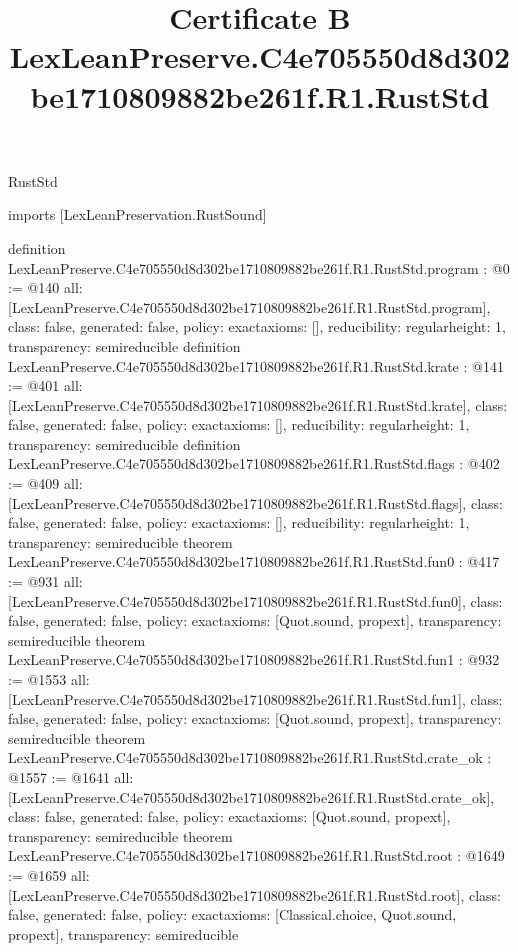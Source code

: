 \begin{lexlean}{RustStd}
\title{Certificate B LexLeanPreserve.C4e705550d8d302be1710809882be261f.R1.RustStd}
\begin{coremodule}
imports [LexLeanPreservation.RustSound]

definition LexLeanPreserve.C4e705550d8d302be1710809882be261f.R1.RustStd.program : @0 := @140 {
  all: [LexLeanPreserve.C4e705550d8d302be1710809882be261f.R1.RustStd.program],
  class: false,
  generated: false,
  policy: exact{axioms: []},
  reducibility: regular{height: 1},
  transparency: semireducible
}
definition LexLeanPreserve.C4e705550d8d302be1710809882be261f.R1.RustStd.krate : @141 := @401 {
  all: [LexLeanPreserve.C4e705550d8d302be1710809882be261f.R1.RustStd.krate],
  class: false,
  generated: false,
  policy: exact{axioms: []},
  reducibility: regular{height: 1},
  transparency: semireducible
}
definition LexLeanPreserve.C4e705550d8d302be1710809882be261f.R1.RustStd.flags : @402 := @409 {
  all: [LexLeanPreserve.C4e705550d8d302be1710809882be261f.R1.RustStd.flags],
  class: false,
  generated: false,
  policy: exact{axioms: []},
  reducibility: regular{height: 1},
  transparency: semireducible
}
theorem LexLeanPreserve.C4e705550d8d302be1710809882be261f.R1.RustStd.fun0 : @417 := @931 {
  all: [LexLeanPreserve.C4e705550d8d302be1710809882be261f.R1.RustStd.fun0],
  class: false,
  generated: false,
  policy: exact{axioms: [Quot.sound, propext]},
  transparency: semireducible
}
theorem LexLeanPreserve.C4e705550d8d302be1710809882be261f.R1.RustStd.fun1 : @932 := @1553 {
  all: [LexLeanPreserve.C4e705550d8d302be1710809882be261f.R1.RustStd.fun1],
  class: false,
  generated: false,
  policy: exact{axioms: [Quot.sound, propext]},
  transparency: semireducible
}
theorem LexLeanPreserve.C4e705550d8d302be1710809882be261f.R1.RustStd.crate_ok : @1557 := @1641 {
  all: [LexLeanPreserve.C4e705550d8d302be1710809882be261f.R1.RustStd.crate_ok],
  class: false,
  generated: false,
  policy: exact{axioms: [Quot.sound, propext]},
  transparency: semireducible
}
theorem LexLeanPreserve.C4e705550d8d302be1710809882be261f.R1.RustStd.root : @1649 := @1659 {
  all: [LexLeanPreserve.C4e705550d8d302be1710809882be261f.R1.RustStd.root],
  class: false,
  generated: false,
  policy: exact{axioms: [Classical.choice, Quot.sound, propext]},
  transparency: semireducible
}


\end{coremodule}
\end{lexlean}

